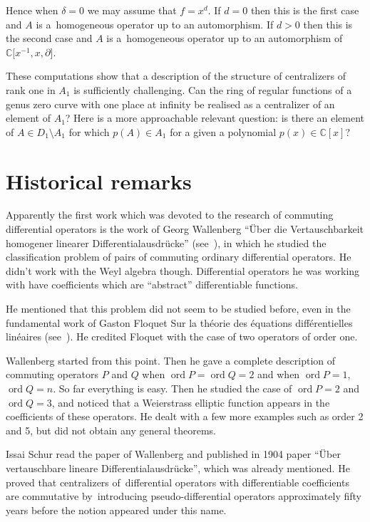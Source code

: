 \documentclass[pdftex]{sigma}
\numberwithin{equation}{section}
\newcommand{\de}{\partial}
\newcommand{\C}{\mathbb C}
\newcommand{\ord}{\operatorname{ord}}
\begin{document}
Hence when $\delta = 0$ we may assume that $f = x^d$. If $d = 0$ then this is the first case and $A$ is a~homogeneous operator up to an automorphism. If $d > 0$ then this is the second case and $A$ is a~homogeneous operator up to an automorphism of $\C\big[x^{-1},x, \de\big]$.

These computations show that a description of the structure of centralizers of rank one in $A_1$ is sufficiently challenging.
Can the ring of regular functions of a genus zero curve with one place at infinity be realised as a centralizer of an element of $A_1$? Here is a more approachable relevant question: is there an element of $A \in D_1 \setminus A_1$ for which $p(A) \in A_1$ for a given a polynomial $p(x) \in \C[x]$?

\section{Historical remarks}

Apparently the first work which was devoted to the research of commuting differential operators is the work of
Georg Wallenberg ``\"Uber die Vertauschbarkeit homogener linearer Differentialausdr\"ucke'' (see~\cite{W}),
in which he studied the classification problem of pairs of commuting ordinary differential operators. He didn't work with the Weyl algebra though.
Differential ope\-rators he was working with have coefficients which are ``abstract'' differentiable functions.

He mentioned that this problem did not seem to be studied before, even in the fundamental work of Gaston Floquet Sur la th\'eorie des \'equations diff\'erentielles lin\'eaires (see~\cite{F}).
He credited Floquet with the case of two operators of order one.

Wallenberg started from this point. Then he gave a complete description of commuting operators $P$ and $Q$ when $\ord P = \ord Q = 2$ and when $\ord P = 1$, $\ord Q = n$. So far everything is easy. Then he studied the case of $\ord P = 2$ and $\ord Q = 3$, and noticed that a Weierstrass elliptic function appears in the coefficients of these operators.
He dealt with a few more examples such as order 2 and 5, but did not obtain any general theorems.

Issai Schur read the paper of Wallenberg and published in 1904 paper ``\"Uber vertauschbare line\-are Differentialausdr\"ucke'', which was already mentioned. He proved that centralizers of~differential operators with differentiable coefficients are commutative by~introducing pseudo-dif\-fe\-ren\-tial operators approximately fifty years before the notion appeared under this name.
\end{document}
